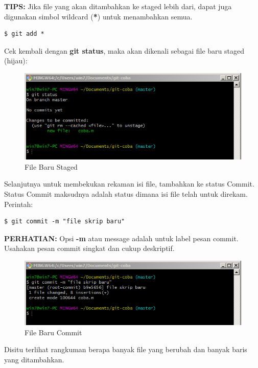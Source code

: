 \documentclass[12pt]{book}
\begin{document}
	\textbf{TIPS:} Jika file yang akan ditambahkan ke staged lebih dari,
	dapat juga digunakan simbol wildcard (\textbf{*}) untuk menambahkan semua.
	\begin{verbatim}
$ git add *
	\end{verbatim}
	
	Cek kembali dengan \textbf{git status}, maka akan dikenali sebagai file baru staged (hijau):
	
	\begin{figure}[!ht]
		\centering
		\includegraphics[width=400pt]{images/git4}
		\caption{File Baru Staged}
	\end{figure}

	Selanjutnya untuk membekukan rekaman isi file, tambahkan ke status Commit.
	Status Commit maksudnya adalah status dimana isi file telah untuk direkam.
	Perintah:
	\begin{verbatim}
$ git commit -m "file skrip baru"
	\end{verbatim}

	\textbf{PERHATIAN:} Opsi \textbf{-m} atau message adalah untuk label pesan commit.
	Usahakan pesan commit singkat dan cukup deskriptif.
	
	\begin{figure}[!ht]
		\centering
		\includegraphics[width=400pt]{images/git5}
		\caption{File Baru Commit}
	\end{figure}

	Disitu terlihat rangkuman berapa banyak file yang berubah dan banyak baris yang ditambahkan.
	
\end{document}
